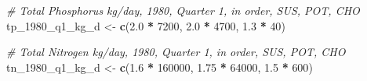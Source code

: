 \documentclass[
]{article}
\newenvironment{Shaded}{\begin{snugshade}}{\end{snugshade}}
\newcommand{\CommentTok}[1]{\textcolor[rgb]{0.56,0.35,0.01}{\textit{#1}}}
\newcommand{\DecValTok}[1]{\textcolor[rgb]{0.00,0.00,0.81}{#1}}
\newcommand{\FloatTok}[1]{\textcolor[rgb]{0.00,0.00,0.81}{#1}}
\newcommand{\KeywordTok}[1]{\textcolor[rgb]{0.13,0.29,0.53}{\textbf{#1}}}
\newcommand{\NormalTok}[1]{#1}
\newcommand{\OperatorTok}[1]{\textcolor[rgb]{0.81,0.36,0.00}{\textbf{#1}}}
\newcommand{\StringTok}[1]{\textcolor[rgb]{0.31,0.60,0.02}{#1}}
\begin{document}
\begin{Shaded}
\begin{Highlighting}[]
\CommentTok{# Total Phosphorus kg/day, 1980, Quarter 1, in order, SUS, POT, CHO}
\NormalTok{tp_}\DecValTok{1980}\NormalTok{_q1_kg_d <-}\StringTok{ }\KeywordTok{c}\NormalTok{(}\FloatTok{2.0} \OperatorTok{*}\StringTok{ }\DecValTok{7200}\NormalTok{, }\FloatTok{2.0} \OperatorTok{*}\StringTok{ }\DecValTok{4700}\NormalTok{, }\FloatTok{1.3} \OperatorTok{*}\StringTok{ }\DecValTok{40}\NormalTok{)}

\CommentTok{# Total Nitrogen kg/day, 1980, Quarter 1, in order, SUS, POT, CHO}
\NormalTok{tn_}\DecValTok{1980}\NormalTok{_q1_kg_d <-}\StringTok{ }\KeywordTok{c}\NormalTok{(}\FloatTok{1.6} \OperatorTok{*}\StringTok{ }\DecValTok{160000}\NormalTok{, }\FloatTok{1.75} \OperatorTok{*}\StringTok{ }\DecValTok{64000}\NormalTok{, }\FloatTok{1.5} \OperatorTok{*}\StringTok{ }\DecValTok{600}\NormalTok{)}



\end{Highlighting}
\end{Shaded}
\end{document}
